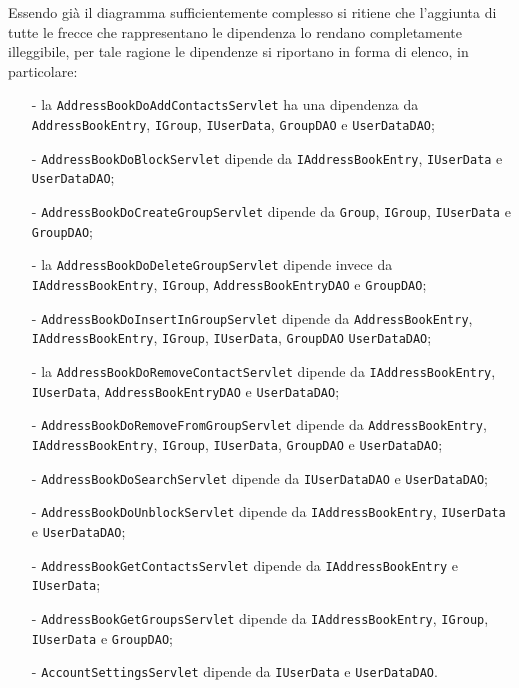 Essendo già il diagramma sufficientemente complesso si ritiene che l'aggiunta di tutte le frecce che rappresentano le dipendenza lo rendano completamente illeggibile, per tale ragione le dipendenze si riportano in forma di elenco, in particolare:
\begin{itemize}[noitemsep,nolistsep,leftmargin=.5em]
  \item[-] la  \texttt{AddressBookDoAddContactsServlet} ha una dipendenza da \texttt{AddressBookEntry}, \texttt{IGroup}, \texttt{IUserData}, \texttt{GroupDAO} e \texttt{UserDataDAO};
  \item[-] \texttt{AddressBookDoBlockServlet} dipende da \texttt{IAddressBookEntry}, \texttt{IUserData} e \texttt{UserDataDAO};
  \item[-] \texttt{AddressBookDoCreateGroupServlet} dipende da \texttt{Group}, \texttt{IGroup}, \texttt{IUserData} e \texttt{GroupDAO};
  \item[-] la   \texttt{AddressBookDoDeleteGroupServlet} dipende invece da \texttt{IAddressBookEntry}, \texttt{IGroup}, \texttt{AddressBookEntryDAO} e \texttt{GroupDAO};
  \item[-] \texttt{AddressBookDoInsertInGroupServlet} dipende da \texttt{AddressBookEntry}, \texttt{IAddressBookEntry}, \texttt{IGroup}, \texttt{IUserData}, \texttt{GroupDAO} \texttt{UserDataDAO};
  \item[-] la  \texttt{AddressBookDoRemoveContactServlet} dipende da \texttt{IAddressBookEntry}, \texttt{IUserData}, \texttt{AddressBookEntryDAO} e \texttt{UserDataDAO};
  \item[-] \texttt{AddressBookDoRemoveFromGroupServlet} dipende da \texttt{AddressBookEntry}, \texttt{IAddressBookEntry}, \texttt{IGroup}, \texttt{IUserData}, \texttt{GroupDAO} e \texttt{UserDataDAO};
  \item[-] \texttt{AddressBookDoSearchServlet} dipende da \texttt{IUserDataDAO} e \texttt{UserDataDAO};
  \item[-] \texttt{AddressBookDoUnblockServlet} dipende da \texttt{IAddressBookEntry}, \texttt{IUserData} e \texttt{UserDataDAO};
  \item[-] \texttt{AddressBookGetContactsServlet} dipende da \texttt{IAddressBookEntry} e \texttt{IUserData};
  \item[-] \texttt{AddressBookGetGroupsServlet} dipende da \texttt{IAddressBookEntry}, \texttt{IGroup}, \texttt{IUserData} e \texttt{GroupDAO};
  \item[-] \texttt{AccountSettingsServlet} dipende da \texttt{IUserData} e \texttt{UserDataDAO}.
\end{itemize}

